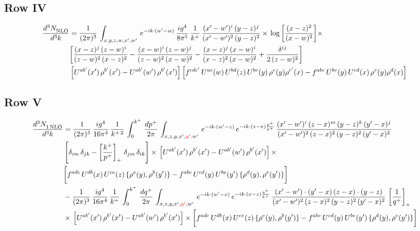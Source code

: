 \documentclass[9pt]{article}
\numberwithin{equation}{section}
\begin{document}
\subsection{Row IV}
\begin{align}
    \frac{d^{3}N_{\rm NLO}^{\rm}}{d^{3}k}  & =   \frac{1}{(2\pi)^{3}}\,
    \int_{x,y,z,w,x',w'}\,e^{-ik\cdot (w^\prime-w)}\, \frac{ig^{4}}{8\pi^{5}}\,\frac{1}{k^{+}}\,\frac{(x'-w')^{i}\,(y-z)^{j}}{(x'-w')^{2}\,(y-z)^{2}}\times\,\log{\left[\frac{(x-z)^{2}}{(x-w)^{2}}\right]}\times\notag \\ &  \bigg[\frac{(x-z)^{j}\,(z-w)^{i}}{(z-w)^{2}\,(x-z)^{2}} -\frac{(x-w)^{i}\,(z-w)^{j}}{(z-w)^{2}\,(x-w)^{2}}-\frac{(x-z)^{j}\,(x-w)^{i}}{(x-z)^{2}\,(x-w)^{2}}+\frac{\delta^{ij}}{2\,(z-w)^{2}}\bigg]\notag \\ &  \left[U^{ab'}(x')\,\rho^{b'}(x')-U^{ab'}(w')\,\rho^{b'}(x')\right] \left[f^{cdc'}\,U^{ac}(w)\,U^{bd}(z)\,U^{be}(y)\,\rho^{e}(y)\rho^{c'}(x)-f^{abc}\,U^{be}(y)\,U^{cd}(x)\,\rho^{e}(y)\rho^{d}(x)\right]
\end{align}
\subsection{Row V}
\begin{align}
     \frac{d^{3}N_{1\,\rm NLO}^{\rm}}{d^{3}k}  & =  \frac{1}{(2\pi)^{3}}\, \frac{ig^{4}}{16\pi^{4}}\, \frac{1}{k^{+\,2}}\,\int_{0}^{k^{+}}\, \frac{dp^{+}}{2\pi}\,\int_{x,z,y,x',{\color{red}y',}w'}\,e^{-ik\cdot (w^\prime-z)}\,e^{-ik\cdot (z-x)\frac{p^{+}}{k^{+}}}\,\frac{(x'-w')^{i}\,(z-x)^{m}\,(y-z)^{k}\,(y'-x)^{j}}{(x'-w')^{2}\,(z-x)^{2}\,(y-z)^{2}\,(y'-x)^{2}}\,\notag \\ & \left[\delta_{im}\,\delta_{jk}-\left[\frac{k^{+}}{p^{+}}\right]_{+}\, \delta_{jm}\,\delta_{ik}\right]\times\, \left[U^{ab'}(x')\,\rho^{b'}(x')-U^{ab'}(w')\,\rho^{b'}(x')\right]\times\notag \\ & \bigg[f^{adc}\,U^{db}(x)\,U^{ce}(z)\, \{\rho^{e}(y),\rho^{b}(y')\}-f^{abc}\,U^{cd}(y)\,U^{be}(y')\, \{\rho^{d}(y),\rho^{e}(y')\}\bigg] \notag \\ & -\frac{1}{(2\pi)^{3}}\, \frac{ig^{4}}{16\pi^{4}}\, \frac{1}{k^{+}}\,\int_{0}^{k^{+}}\, \frac{dq^{+}}{2\pi}\,\int_{x,z,y,x',{\color{red}y',}w'}\,e^{-ik\cdot (w^\prime-x)}\,e^{-ik\cdot (x-z)\frac{q^{+}}{k^{+}}}\,\frac{(x'-w')\cdot (y'-x)\,(z-x)\cdot (y-z)}{(x'-w')^{2}\,(z-x)^{2}\,(y-z)^{2}\,(y'-x)^{2}}\,\left[\frac{1}{q^{+}}\right]_{+}\notag \\ & \times\, \left[U^{ab'}(x')\,\rho^{b'}(x')-U^{ab'}(w')\,\rho^{b'}(x')\right]\times \bigg[f^{adc}\,U^{db}(x)\,U^{ce}(z)\, \{\rho^{e}(y),\rho^{b}(y')\}-f^{abc}\,U^{cd}(y)\,U^{be}(y')\, \{\rho^{d}(y),\rho^{e}(y')\}\bigg]
\end{align}
\end{document}
